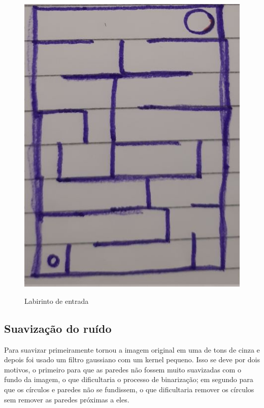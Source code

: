 \documentclass[conference]{IEEEtran}
\begin{document}
 \begin{figure}[h!]
   \centering
    {\includegraphics[scale=0.25]{medium.jpg}
    \label{fig:medium}
    \caption{Labirinto de entrada}
    }
\end{figure}

\subsection{Suavização do ruído}
 Para suavizar primeiramente tornou a imagem original em uma de tons de cinza e depois foi usado um filtro gaussiano com um kernel pequeno. Isso se deve por dois motivos, o primeiro para que as paredes não fossem muito suavizadas com o fundo da imagem, o que dificultaria o processo de binarização; em segundo para que os círculos e paredes não se fundissem, o que dificultaria remover os círculos sem remover as paredes próximas a eles.
\end{document}
